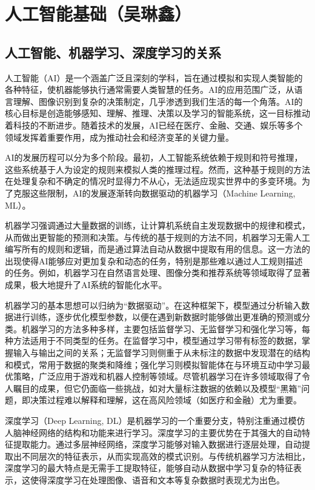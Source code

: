 \chapter{人工智能基础（吴琳鑫）}

\section{人工智能、机器学习、深度学习的关系}

人工智能（AI）是一个涵盖广泛且深刻的学科，旨在通过模拟和实现人类智能的各种特征，使机器能够执行通常需要人类智慧的任务。AI的应用范围广泛，从语言理解、图像识别到复杂的决策制定，几乎渗透到我们生活的每一个角落。AI的核心目标是创造能够感知、理解、推理、决策以及学习的智能系统，这一目标推动着科技的不断进步。随着技术的发展，AI已经在医疗、金融、交通、娱乐等多个领域发挥着重要作用，成为推动社会和经济变革的关键力量。

AI的发展历程可以分为多个阶段。最初，人工智能系统依赖于规则和符号推理，这些系统基于人为设定的规则来模拟人类的推理过程。然而，这种基于规则的方法在处理复杂和不确定的情况时显得力不从心，无法适应现实世界中的多变环境。为了克服这些限制，AI的发展逐渐转向数据驱动的机器学习（Machine Learning, ML）。

机器学习强调通过大量数据的训练，让计算机系统自主发现数据中的规律和模式，从而做出更智能的预测和决策。与传统的基于规则的方法不同，机器学习无需人工编写所有的规则和逻辑，而是通过算法自动从数据中提取有用的信息。这一方法的出现使得AI能够应对更加复杂和动态的任务，特别是那些难以通过人工规则描述的任务。例如，机器学习在自然语言处理、图像分类和推荐系统等领域取得了显著成果，极大地提升了AI系统的智能化水平。

机器学习的基本思想可以归纳为“数据驱动”。在这种框架下，模型通过分析输入数据进行训练，逐步优化模型参数，以便在遇到新数据时能够做出更准确的预测或分类。机器学习的方法多种多样，主要包括监督学习、无监督学习和强化学习等，每种方法适用于不同类型的任务。在监督学习中，模型通过学习带有标签的数据，掌握输入与输出之间的关系；无监督学习则侧重于从未标注的数据中发现潜在的结构和模式，常用于数据的聚类和降维；强化学习则模拟智能体在与环境互动中学习最优策略，广泛应用于游戏和机器人控制等领域。尽管机器学习在许多领域取得了令人瞩目的成果，但它仍面临一些挑战，如对大量标注数据的依赖以及模型“黑箱”问题，即决策过程难以解释和理解，这在高风险领域（如医疗和金融）尤为重要。

深度学习（Deep Learning, DL）是机器学习的一个重要分支，特别注重通过模仿人脑神经网络的结构和功能来进行学习。深度学习的主要优势在于其强大的自动特征提取能力。通过多层神经网络，深度学习能够对输入数据进行逐层处理，自动提取出不同层次的特征表示，从而实现高效的模式识别。与传统机器学习方法相比，深度学习的最大特点是无需手工提取特征，能够自动从数据中学习复杂的特征表示，这使得深度学习在处理图像、语音和文本等复杂数据时表现尤为出色。

